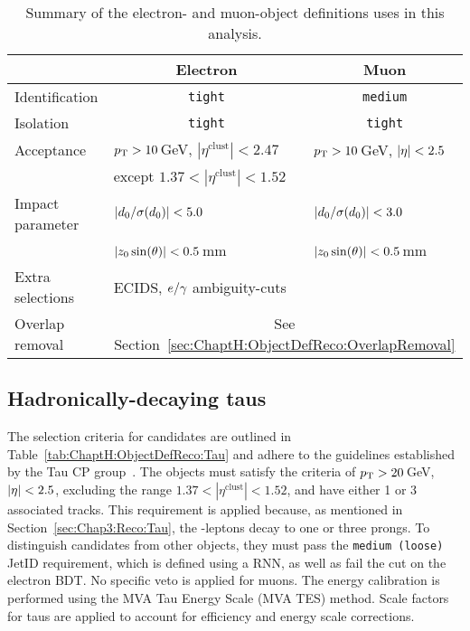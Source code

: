 \begin{table}[!htbp]
  \begin{tabular}{ l|l|l }
    \toprule
    & \multicolumn{1}{c|}{Electron} & \multicolumn{1}{c}{Muon} \\
    \midrule
    Identification  & \multicolumn{1}{c|}{\texttt{tight}} &  \multicolumn{1}{c}{\texttt{medium}}\\
    Isolation         & \multicolumn{1}{c|}{\texttt{tight}}  & \multicolumn{1}{c|}{\texttt{tight}} \\
    Acceptance    & $p_{\text{T}} > 10\,$GeV, $|\eta^\mathrm{clust}| < 2.47$  & $p_{\text{T}} > 10\,$GeV, $|\eta| < 2.5$ \\
                     &  except $1.37 < |\eta^\mathrm{clust}| < 1.52$          & \\
    Impact parameter & $|d_{0}/\sigma(d_{0})| < 5.0$                   & $|d_{0}/\sigma(d_{0})| < 3.0$ \\
                     & $|z_{0} \sin(\theta)| < 0.5\,$mm                      & $|z_{0} \sin(\theta)| < 0.5\,$mm \\
    
    Extra selections & ECIDS, $e/\gamma$ ambiguity-cuts &  \\
    \midrule
    Overlap removal & \multicolumn{2}{c}{See Section~\ref{sec:ChaptH:ObjectDefReco:OverlapRemoval}} \\

    \bottomrule
  \end{tabular}
  \caption{Summary of the electron- and muon-object definitions uses in this analysis.}
   \label{tab:ChaptH:ObjectDefReco:Electrons_Muons} %
\end{table}


%
\subsection{Hadronically-decaying taus}
\label{sec:ChaptH:ObjectDefReco:tau}
The selection criteria for \tauhad candidates are outlined in Table~\ref{tab:ChaptH:ObjectDefReco:Tau} 
and adhere to the guidelines established by the Tau CP group~\cite{ATLAS:2015boj, ATLAS:2019uhp}. 
The \tauhad objects must satisfy the criteria of $p_{\text{T}} > 20\,$GeV, $|\eta| < 2.5$, excluding the range 
$1.37 < |\eta^\mathrm{clust}| < 1.52$, and have either 1 or 3 associated tracks. 
This requirement is applied because, as mentioned in Section~\ref{sec:Chap3:Reco:Tau}, the \Ptau-leptons
decay to one or three prongs.
To distinguish \tauhad candidates from other objects, they must pass the \texttt{medium (loose)} JetID 
requirement, which is defined using a RNN, as well as fail the cut 
on the electron BDT. No specific veto is applied for muons. The energy calibration is performed using 
the MVA Tau Energy Scale (MVA TES) method.
Scale factors for taus are applied to 
account for efficiency and energy scale corrections. %


